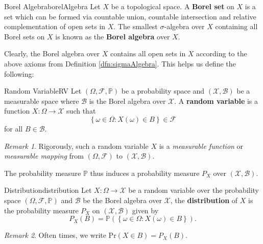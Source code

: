 \documentclass[math, code]{amznotes}
\theoremstyle{remark}
\newtheorem*{remark}{Remark}
\begin{document}
\begin{dfnbox}{Borel Algebra}{borelAlgebra}
    Let $X$ be a topological space. A {\color{red} \textbf{Borel set}} on $X$ is a set which can be formed via countable union, countable intersection and relative complementation of open sets in $X$. The smallest $\sigma$-algebra over $X$ containing all Borel sets on $X$ is known as the {\color{red} \textbf{Borel algebra}} over $X$.
\end{dfnbox}
Clearly, the Borel algebra over $X$ contains all open sets in $X$ according to the above axioms from Definition \ref{dfn:sigmaAlgebra}. This helps us define the following:
\begin{dfnbox}{Random Variable}{RV}
    Let $\left(\Omega, \mathcal{F}, \mathbb{P}\right)$ be a probability space and $\left(\mathcal{X}, \mathcal{B}\right)$ be a measurable space where $\mathcal{B}$ is the Borel algebra over $\mathcal{X}$. A {\color{red} \textbf{random variable}} is a function $X \colon \Omega \to \mathcal{X}$ such that 
    \begin{equation*}
        \left\{\omega \in \Omega \colon X\left(\omega\right) \in B\right\} \in \mathcal{F} 
    \end{equation*}
    for all $B \in \mathcal{B}$.
\end{dfnbox}
\begin{notebox}
    \begin{remark}
        Rigorously, such a random variable $X$ is a \textit{measurable function} or \textit{measurable mapping} from $\left(\Omega, \mathcal{F}\right)$ to $\left(\mathcal{X}, \mathcal{B}\right)$.
    \end{remark}
\end{notebox}
The probability measure $\mathbb{P}$ thus induces a probability measure $P_X$ over $\left(\mathcal{X}, \mathcal{B}\right)$.
\begin{dfnbox}{Distribution}{distribution}
    Let $X \colon \Omega \to \mathcal{X}$ be a random variable over the probability space $\left(\Omega, \mathcal{F}, \mathbb{P}\right)$ and $\mathcal{B}$ be the Borel algebra over $\mathcal{X}$, the {\color{red} \textbf{distribution}} of $X$ is the probability measure $P_X$ on $\left(\mathcal{X}, \mathcal{B}\right)$ given by 
    \begin{equation*}
        P_X\left(B\right) = \mathbb{P}\left(\left\{\omega \in \Omega \colon X\left(\omega\right) \in B\right\}\right).
    \end{equation*}
\end{dfnbox}
\begin{notebox}
    \begin{remark}
        Often times, we write $\mathrm{Pr}\left(X \in B\right) = P_X\left(B\right)$.
    \end{remark}
\end{notebox}
\end{document}
